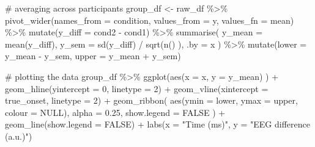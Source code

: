 \documentclass[
  doc,
  floatsintext,
  longtable,
  a4paper,
  nolmodern,
  notxfonts,
  notimes,
  colorlinks=true,linkcolor=blue,citecolor=blue,urlcolor=blue]{apa7}
\newenvironment{Shaded}{\begin{snugshade}}{\end{snugshade}}
\newcommand{\AttributeTok}[1]{\textcolor[rgb]{0.40,0.45,0.13}{#1}}
\newcommand{\CommentTok}[1]{\textcolor[rgb]{0.37,0.37,0.37}{#1}}
\newcommand{\ConstantTok}[1]{\textcolor[rgb]{0.56,0.35,0.01}{#1}}
\newcommand{\DecValTok}[1]{\textcolor[rgb]{0.68,0.00,0.00}{#1}}
\newcommand{\FloatTok}[1]{\textcolor[rgb]{0.68,0.00,0.00}{#1}}
\newcommand{\FunctionTok}[1]{\textcolor[rgb]{0.28,0.35,0.67}{#1}}
\newcommand{\NormalTok}[1]{\textcolor[rgb]{0.00,0.23,0.31}{#1}}
\newcommand{\OtherTok}[1]{\textcolor[rgb]{0.00,0.23,0.31}{#1}}
\newcommand{\SpecialCharTok}[1]{\textcolor[rgb]{0.37,0.37,0.37}{#1}}
\newcommand{\StringTok}[1]{\textcolor[rgb]{0.13,0.47,0.30}{#1}}
\begin{document}
\begin{Shaded}
\begin{Highlighting}[]
\CommentTok{\# averaging across participants}
\NormalTok{group\_df }\OtherTok{\textless{}{-}}\NormalTok{ raw\_df }\SpecialCharTok{\%\textgreater{}\%}
    \FunctionTok{pivot\_wider}\NormalTok{(}\AttributeTok{names\_from =}\NormalTok{ condition, }\AttributeTok{values\_from =}\NormalTok{ y, }\AttributeTok{values\_fn =}\NormalTok{ mean) }\SpecialCharTok{\%\textgreater{}\%}
    \FunctionTok{mutate}\NormalTok{(}\AttributeTok{y\_diff =}\NormalTok{ cond2 }\SpecialCharTok{{-}}\NormalTok{ cond1) }\SpecialCharTok{\%\textgreater{}\%}
    \FunctionTok{summarise}\NormalTok{(}
        \AttributeTok{y\_mean =} \FunctionTok{mean}\NormalTok{(y\_diff),}
        \AttributeTok{y\_sem =} \FunctionTok{sd}\NormalTok{(y\_diff) }\SpecialCharTok{/} \FunctionTok{sqrt}\NormalTok{(}\FunctionTok{n}\NormalTok{() ),}
        \AttributeTok{.by =}\NormalTok{ x}
\NormalTok{        ) }\SpecialCharTok{\%\textgreater{}\%}
    \FunctionTok{mutate}\NormalTok{(}\AttributeTok{lower =}\NormalTok{ y\_mean }\SpecialCharTok{{-}}\NormalTok{ y\_sem, }\AttributeTok{upper =}\NormalTok{ y\_mean }\SpecialCharTok{+}\NormalTok{ y\_sem)}

\CommentTok{\# plotting the data}
\NormalTok{group\_df }\SpecialCharTok{\%\textgreater{}\%}
    \FunctionTok{ggplot}\NormalTok{(}\FunctionTok{aes}\NormalTok{(}\AttributeTok{x =}\NormalTok{ x, }\AttributeTok{y =}\NormalTok{ y\_mean) ) }\SpecialCharTok{+}
    \FunctionTok{geom\_hline}\NormalTok{(}\AttributeTok{yintercept =} \DecValTok{0}\NormalTok{, }\AttributeTok{linetype =} \DecValTok{2}\NormalTok{) }\SpecialCharTok{+}
    \FunctionTok{geom\_vline}\NormalTok{(}\AttributeTok{xintercept =}\NormalTok{ true\_onset, }\AttributeTok{linetype =} \DecValTok{2}\NormalTok{) }\SpecialCharTok{+}
    \FunctionTok{geom\_ribbon}\NormalTok{(}
        \FunctionTok{aes}\NormalTok{(}\AttributeTok{ymin =}\NormalTok{ lower, }\AttributeTok{ymax =}\NormalTok{ upper, }\AttributeTok{colour =} \ConstantTok{NULL}\NormalTok{),}
        \AttributeTok{alpha =} \FloatTok{0.25}\NormalTok{, }\AttributeTok{show.legend =} \ConstantTok{FALSE}
\NormalTok{        ) }\SpecialCharTok{+}
    \FunctionTok{geom\_line}\NormalTok{(}\AttributeTok{show.legend =} \ConstantTok{FALSE}\NormalTok{) }\SpecialCharTok{+}
    \FunctionTok{labs}\NormalTok{(}\AttributeTok{x =} \StringTok{"Time (ms)"}\NormalTok{, }\AttributeTok{y =} \StringTok{"EEG difference (a.u.)"}\NormalTok{)}
\end{Highlighting}
\end{Shaded}
\end{document}
